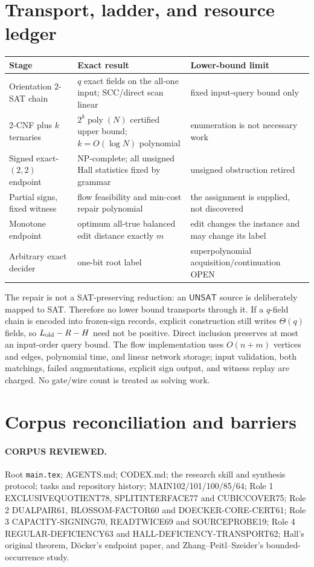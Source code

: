 \documentclass[11pt]{article}
\newcommand{\UNSAT}{\mathsf{UNSAT}}
\begin{document}
\section{Transport, ladder, and resource ledger}

\begin{longtable}{p{.19\linewidth}p{.34\linewidth}p{.37\linewidth}}
\toprule
Stage & Exact result & Lower-bound limit\\\midrule\endhead
Orientation 2-SAT chain & $q$ exact fields on the all-one input; SCC/direct scan linear & fixed input-query bound only\\
2-CNF plus $k$ ternaries & $2^k\operatorname{poly}(N)$ certified upper bound; $k=O(\log N)$ polynomial & enumeration is not necessary work\\
Signed exact-$(2,2)$ endpoint & NP-complete; all unsigned Hall statistics fixed by grammar & unsigned obstruction retired\\
Partial signs, fixed witness & flow feasibility and min-cost repair polynomial & the assignment is supplied, not discovered\\
Monotone endpoint & optimum all-true balanced edit distance exactly $m$ & edit changes the instance and may change its label\\
Arbitrary exact decider & one-bit root label & superpolynomial acquisition/continuation OPEN\\
\bottomrule
\end{longtable}

The repair is not a SAT-preserving reduction: an $\UNSAT$ source is deliberately mapped
to SAT.  Therefore no lower bound transports through it.  If a $q$-field chain is encoded
into frozen-sign records, explicit construction still writes $\Theta(q)$ fields, so
$L_{\rm old}-R-H$ need not be positive.  Direct inclusion preserves at most an input-order
query bound.  The flow implementation uses $O(n+m)$ vertices and edges, polynomial time,
and linear network storage; input validation, both matchings, failed augmentations, explicit
sign output, and witness replay are charged.  No gate/wire count is treated as solving work.

\section{Corpus reconciliation and barriers}

\paragraph{CORPUS REVIEWED.}
Root \texttt{main.tex}; AGENTS.md; CODEX.md; the research skill and synthesis protocol;
tasks and repository history; MAIN102/101/100/85/64; Role 1 EXCLUSIVEQUOTIENT78,
SPLITINTERFACE77 and CUBICCOVER75; Role 2 DUALPAIR61, BLOSSOM-FACTOR60 and
DOECKER-CORE-CERT61; Role 3 CAPACITY-SIGNING70, READTWICE69 and SOURCEPROBE19; Role 4
REGULAR-DEFICIENCY63 and HALL-DEFICIENCY-TRANSPORT62; Hall's original theorem,
D\"ocker's endpoint paper, and Zhang--Peitl--Szeider's bounded-occurrence study.
\end{document}
